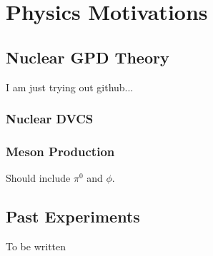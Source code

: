 
\chapter{Physics Motivations}
\label{chap:physics}

\section{Nuclear GPD Theory}
I am just trying out github...

\subsection{Nuclear DVCS}

\subsection{Meson Production}

Should include $\pi^0$ and $\phi$.

\section{Past Experiments}
To be written

